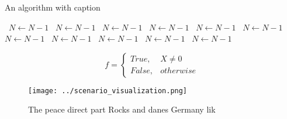 \documentclass[a4paper]{article}
\begin{document}
\begin{algorithm}
\caption{An algorithm with caption}
\begin{algorithmic}
\    \State $N \gets N - 1$
\    \State $N \gets N - 1$
\    \State $N \gets N - 1$
\    \State $N \gets N - 1$
\    \State $N \gets N - 1$
\    \State $N \gets N - 1$
\    \State $N \gets N - 1$
\    \State $N \gets N - 1$
\    \State $N \gets N - 1$
\    \State $N \gets N - 1$
\    \State $N \gets N - 1$
\EndWhile
\end{algorithmic}
\end{algorithm}

\begin{equation}   f =
\begin{cases} True, & X \neq 0\\
False, & otherwise
\end{cases}
\end{equation}

\begin{figure}
\centering
\texttt{[image: ../scenario\_visualization.png]}
\caption{The peace direct part Rocks and danes Germany lik
}
\end{figure}
 
\end{document}
